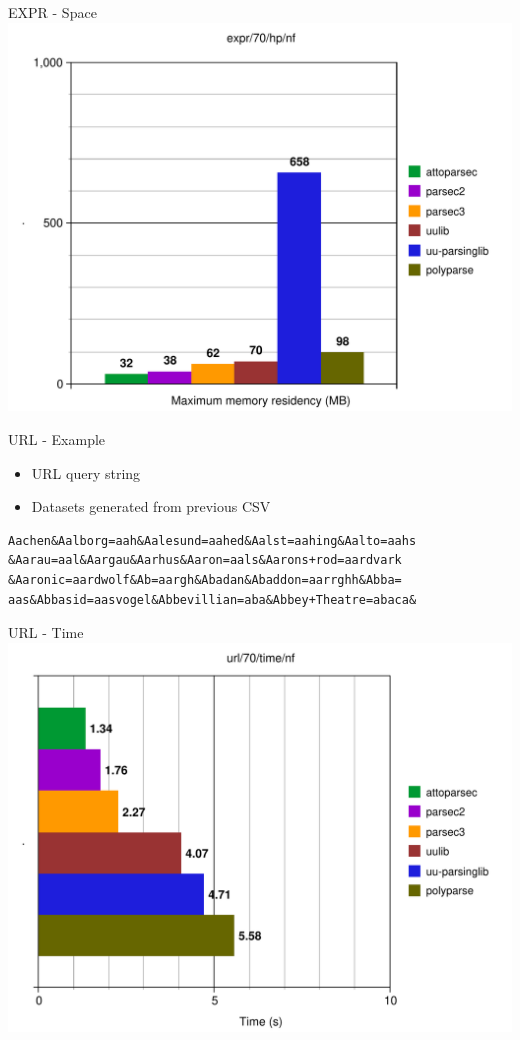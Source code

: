 \documentclass{beamer}
\begin{document}
\begin{frame}{EXPR - Space}
\includegraphics[scale=0.5]{presentation/expr-70-hp-nf.pdf}
\end{frame}

\begin{frame}[fragile]{URL - Example}
\begin{itemize}
\item URL query string
\item Datasets generated from previous CSV
\end{itemize}
\begin{verbatim}
Aachen&Aalborg=aah&Aalesund=aahed&Aalst=aahing&Aalto=aahs
&Aarau=aal&Aargau&Aarhus&Aaron=aals&Aarons+rod=aardvark
&Aaronic=aardwolf&Ab=aargh&Abadan&Abaddon=aarrghh&Abba=
aas&Abbasid=aasvogel&Abbevillian=aba&Abbey+Theatre=abaca&
\end{verbatim}
\end{frame}

\begin{frame}{URL - Time}
\includegraphics[scale=0.5]{presentation/url-70-time-nf.pdf}
\end{frame}
\end{document}
